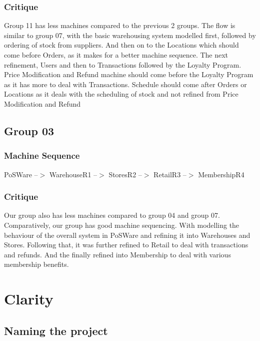 \subsubsection{Critique}
\label{critique}

Group 11 has less machines compared to the previous 2 groups. The flow is similar to group 07, with the basic warehousing system modelled first, followed by ordering of stock from suppliers. And then on to the Locations which should come before Orders, as it makes for a better machine sequence. The next refinement, Users and then to Transactions followed by the Loyalty Program. Price Modification and Refund machine should come before the Loyalty Program as it has more to deal with Transactions. Schedule should come after Orders or Locations as it deals with the scheduling of stock and not refined from Price Modification and Refund

\subsection{Group 03}
\label{group03}

\subsubsection{Machine Sequence}
\label{machinesequence}

PoSWare --$>$ WarehouseR1 --$>$ StoresR2 --$>$ RetailR3 --$>$ MembershipR4

\subsubsection{Critique}
\label{critique}

Our group also has less machines compared to group 04 and group 07. Comparatively, our group has good machine sequencing. With modelling the behaviour of the overall system in PoSWare and refining it into Warehouses and Stores. Following that, it was further refined to Retail to deal with transactions and refunds. And the finally refined into Membership to deal with various membership benefits.

\section{Clarity}
\label{clarity}

\subsection{Naming the project}
\label{namingtheproject}


